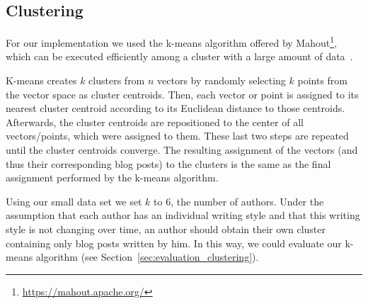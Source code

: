 \subsection{Clustering}
\label{sec:impl_clustering}

For our implementation we used the k-means algorithm offered by Mahout\footnote{\url{https://mahout.apache.org/}}, which can be executed efficiently among a cluster with a large amount of data~\cite{esteves2011k}.


K-means creates $k$ clusters from $n$ vectors by randomly selecting $k$ points from the vector space as cluster centroids.
Then, each vector or point is assigned to its nearest cluster centroid according to its Euclidean distance to those centroids.
Afterwards, the cluster centroids are repositioned to the center of all vectors/points, which were assigned to them.
These last two steps are repeated until the cluster centroids converge.
The resulting assignment of the vectors (and thus their corresponding blog posts) to the clusters is the same as the final assignment performed by the k-means algorithm.


Using our small data set we set $k$ to 6, the number of authors.
Under the assumption that each author has an individual writing style and that this writing style is not changing over time, an author should obtain their own cluster containing only blog posts written by him.
In this way, we could evaluate our k-means algorithm (see Section~\ref{sec:evaluation_clustering}).


